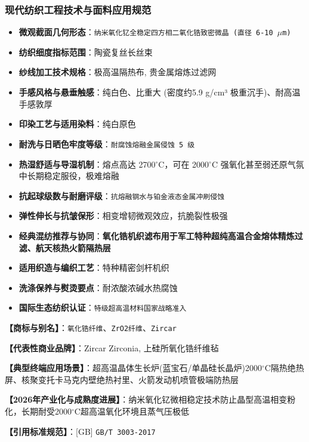\documentclass[11pt,openright,twoside,UTF8]{ctexbook}
\begin{document}
\subsubsection*{现代纺织工程技术与面料应用规范}
\begin{itemize} \setlength{\itemsep}{2pt}
    \item \textbf{微观截面几何形态}：\texttt{纳米氧化钇全稳定四方相二氧化锆致密微晶 (直径 6-10 $\mu$m)}
    \item \textbf{纺织细度指标范围}：陶瓷复丝长丝束
    \item \textbf{纱线加工技术规格}：极高温隔热布, 贵金属熔炼过滤网
    \item \textbf{手感风格与悬垂触感}：纯白色、比重大 (密度约5.9 g/cm³ 极重沉手)、耐高温手感敦厚
    \item \textbf{印染工艺与适用染料}：纯白原色
    \item \textbf{耐洗与日晒色牢度等级}：\texttt{耐腐蚀熔融金属侵蚀 5 级}
    \item \textbf{热湿舒适与导湿机制}：熔点高达 2700$^\circ\mathrm{C}$，可在 2000$^\circ\mathrm{C}$ 强氧化甚至弱还原气氛中长期稳定服役，极难熔融
    \item \textbf{抗起球级数与耐磨评级}：\texttt{抗熔融钢水与铂金液态金属冲刷侵蚀}
    \item \textbf{弹性伸长与抗皱保形}：相变增韧微观效应，抗脆裂性极强
    \item \textbf{经典混纺推荐与协同}：\textbf{氧化锆机织滤布用于军工特种超纯高温合金熔体精炼过滤、航天核热火箭隔热层}
    \item \textbf{适用织造与编织工艺}：特种精密剑杆机织
    \item \textbf{洗涤保养与熨烫要点}：耐浓酸浓碱水热腐蚀
    \item \textbf{国际生态纺织认证}：\texttt{特级超高温材料国家战略准入}
\end{itemize}
\vspace{0.2cm}

\noindent\textbf{【商标与别名】}：\texttt{氧化锆纤维}、\texttt{ZrO2纤维}、\texttt{Zircar}\par
\noindent\textbf{【代表性商业品牌】}：Zircar Zirconia, 上硅所氧化锆纤维毡\par
\noindent\textbf{【典型终端应用场景】}：超高温晶体生长炉(蓝宝石/单晶硅长晶炉)2000$^\circ\mathrm{C}$隔热绝热屏、核聚变托卡马克内壁绝热衬里、火箭发动机喷管极端防热层\par
\noindent\textbf{【2026年产业化与成熟度进展】}：纳米氧化钇微相稳定技术防止晶型高温相变粉化，长期耐受2000$^\circ\mathrm{C}$超高温氧化环境且蒸气压极低\par
\noindent\textbf{【引用标准规范】}：[GB] \texttt{GB/T 3003-2017}\par
\vspace{0.5cm}
\end{document}
